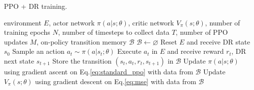 \begin{algorithm}[h!]
\caption{PPO + DR training.}
\label{alg:overall_algo}
\begin{algorithmic}
\REQUIRE environment $E$, actor network $\pi(a|s;\theta)$, critic network $V_{\pi}(s;\theta)$, number of training epochs $N$, number of timesteps to collect data $T$, number of PPO updates $M$, on-policy transition memory $\mathcal{B}$
  \STATE $\mathcal{B} \gets \varnothing$
      \STATE Reset $E$ and receive DR \indent\indent state $s_0$
    \ENDIF
    \STATE Sample an action $a_t \sim \pi(a|s_t;\theta)$
    \STATE Execute $a_{t}$ in $E$ and receive reward $r_t$, DR next \indent\indent state $s_{t+1}$
    \STATE Store the transition $\left(s_t, a_t, r_t, s_{t+1} \right)$ in $\mathcal{B}$
  \ENDFOR
    \STATE Update $\pi(a|s;\theta)$ using gradient ascent on Eq.\eqref{eq:standard_ppo}  with data from $\mathcal{B}$
    \STATE Update $V_{\pi}(s;\theta)$ using gradient descent on Eq.\eqref{eq:mse} \indent\indent with data from $\mathcal{B}$
  \ENDFOR
\ENDFOR
\end{algorithmic}
\end{algorithm}

